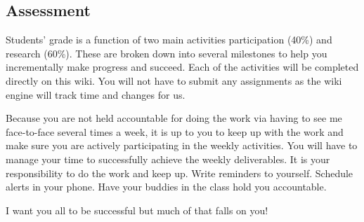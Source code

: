 \documentclass{article}
\begin{document}
\subsection*{Assessment}

Students' grade is a function of two main activities participation (40\%) and research (60\%). These are broken down into several milestones to help you incrementally make progress and succeed. Each of the activities will be completed directly on this wiki. You will not have to submit any assignments as the wiki engine will track time and changes for us.

Because you are not held accountable for doing the work via having to see me face-to-face several times a week, it is up to you to keep up with the work and make sure you are actively participating in the weekly activities. You will have to manage your time to successfully achieve the weekly deliverables. It is your responsibility to do the work and keep up. Write reminders to yourself. Schedule alerts in your phone. Have your buddies in the class hold you accountable.

I want you all to be successful but much of that falls on you!



\nocite{salganik2019bit}
\end{document}
